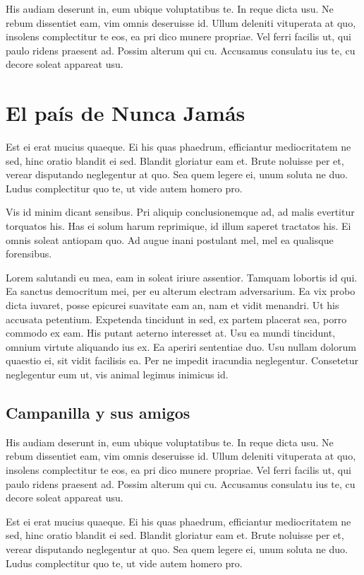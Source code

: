 \documentclass[a4paper, 11pt, titlepage, twocolumn]{book}
\begin{document}
His audiam deserunt in, eum ubique voluptatibus te. In reque dicta usu. Ne rebum dissentiet eam, vim omnis deseruisse id. Ullum deleniti vituperata at quo, insolens complectitur te eos, ea pri dico munere propriae. Vel ferri facilis ut, qui paulo ridens praesent ad. Possim alterum qui cu. Accusamus consulatu ius te, cu decore soleat appareat usu.

\section{El país de Nunca Jamás}

Est ei erat mucius quaeque. Ei his quas phaedrum, efficiantur mediocritatem ne sed, hinc oratio blandit ei sed. Blandit gloriatur eam et. Brute noluisse per et, verear disputando neglegentur at quo. Sea quem legere ei, unum soluta ne duo. Ludus complectitur quo te, ut vide autem homero pro.

Vis id minim dicant sensibus. Pri aliquip conclusionemque ad, ad malis evertitur torquatos his. Has ei solum harum reprimique, id illum saperet tractatos his. Ei omnis soleat antiopam quo. Ad augue inani postulant mel, mel ea qualisque forensibus.

Lorem salutandi eu mea, eam in soleat iriure assentior. Tamquam lobortis id qui. Ea sanctus democritum mei, per eu alterum electram adversarium. Ea vix probo dicta iuvaret, posse epicurei suavitate eam an, nam et vidit menandri. Ut his accusata petentium.
Expetenda tincidunt in sed, ex partem placerat sea, porro commodo ex eam. His putant aeterno interesset at. Usu ea mundi tincidunt, omnium virtute aliquando ius ex. Ea aperiri sententiae duo. Usu nullam dolorum quaestio ei, sit vidit facilisis ea. Per ne impedit iracundia neglegentur. Consetetur neglegentur eum ut, vis animal legimus inimicus id.

\subsection{Campanilla y sus amigos}

His audiam deserunt in, eum ubique voluptatibus te. In reque dicta usu. Ne rebum dissentiet eam, vim omnis deseruisse id. Ullum deleniti vituperata at quo, insolens complectitur te eos, ea pri dico munere propriae. Vel ferri facilis ut, qui paulo ridens praesent ad. Possim alterum qui cu. Accusamus consulatu ius te, cu decore soleat appareat usu.

Est ei erat mucius quaeque. Ei his quas phaedrum, efficiantur mediocritatem ne sed, hinc oratio blandit ei sed. Blandit gloriatur eam et. Brute noluisse per et, verear disputando neglegentur at quo. Sea quem legere ei, unum soluta ne duo. Ludus complectitur quo te, ut vide autem homero pro.
\end{document}
